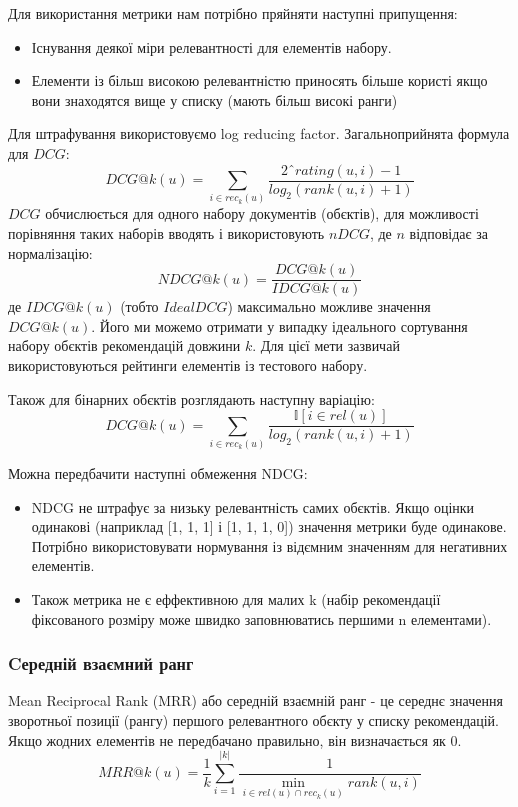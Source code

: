 Для використання метрики нам потрібно пряйняти наступні
припущення:
\begin{itemize}
    \item Існування деякої міри релевантності для елементів набору.
    \item Елементи із більш високою релевантністю приносять більше
          користі якщо вони знаходятся вище у списку (мають більш високі ранги)
\end{itemize}
Для штрафування використовуємо log reducing factor. Загальноприйнята формула для $DCG$:
\[
    DCG@k(u)=\sum_{i \in rec_{k}(u)}\frac{2ˆ{rating(u,i)} - 1}{log_{2}(rank(u,i) + 1)}
\]
$DCG$ обчислюється для одного набору документів (обєктів), для
можливості порівняння таких наборів вводять і використовують
$nDCG$, де $n$ відповідає за нормалізацію:
\[
    NDCG@k(u)=\frac{DCG@k(u)}{IDCG@k(u)}
\]
де $IDCG@k(u)$  (тобто $Ideal DCG$) максимально можливе значення
$DCG@k(u)$. Його ми можемо отримати у випадку ідеального
сортування набору обєктів рекомендацій довжини $k$. Для
цієї мети зазвичай використовуються рейтинги елементів із
тестового набору.

Також для бінарних обєктів розглядають наступну варіацію:
\[
    DCG@k(u)=\sum_{i \in rec_{k}(u)}\frac{\mathbb{I}[i \in rel(u)]}{log_{2}(rank(u,i)+1)}
\]

Можна передбачити наступні обмеження NDCG:
\begin{itemize}
    \item NDCG не штрафує за низьку релевантність самих обєктів.
          Якщо оцінки одинакові (наприклад [1, 1, 1] і  [1, 1, 1, 0])
          значення метрики буде одинакове. Потрібно використовувати
          нормування із відємним значенням для негативних елементів.
    \item Також метрика не є еффективною для малих k (набір
          рекомендації фіксованого розміру може швидко заповнюватись
          першими n елементами).
\end{itemize}
\subsubsection{Cередній взаємний ранг}
Mean Reciprocal Rank (MRR) або середній взаємній ранг - це середнє
значення зворотньої позиції (рангу) першого релевантного обєкту у
списку рекомендацій. Якщо жодних елементів не передбачано
правильно, він визначається як 0.
\[
    MRR@k(u)=\frac{1}{k}\sum_{i=1}^{|k|}\frac{1}{\min\limits_{i \in rel(u) \cap rec_{k}(u)}rank(u,i)}
\]
